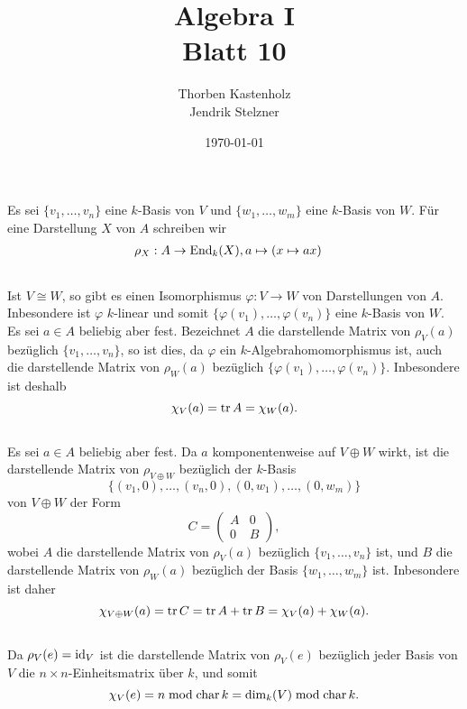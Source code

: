 \documentclass[a4paper,10pt]{article}
\title{\sc Algebra I \\ \Large Blatt 10}
\author{Thorben Kastenholz \\ Jendrik Stelzner}
\date{\today}
\begin{document}
\maketitle






\section{}
Es sei $\{v_1, \ldots, v_n\}$ eine $k$-Basis von $V$ und $\{w_1, \ldots, w_m\}$ eine $k$-Basis von $W$. Für eine Darstellung $X$ von $A$ schreiben wir
\begin{align*}
 &\rho_X : A \to \operatorname{End}_k(X), a \mapsto (x \mapsto ax)
\end{align*}


\subsection{}
Ist $V \cong W$, so gibt es einen Isomorphismus $\varphi : V \to W$ von Darstellungen von $A$. Inbesondere ist $\varphi$ $k$-linear und somit $\{\varphi(v_1), \ldots, \varphi(v_n)\}$ eine $k$-Basis von $W$. Es sei $a \in A$ beliebig aber fest. Bezeichnet $A$ die darstellende Matrix von $\rho_V(a)$ bezüglich $\{v_1, \ldots, v_n\}$, so ist dies, da $\varphi$ ein $k$-Algebrahomomorphismus ist, auch die darstellende Matrix von $\rho_W(a)$ bezüglich $\{\varphi(v_1), \ldots, \varphi(v_n)\}$. Inbesondere ist deshalb
\[
 \chi_V(a) = \operatorname{tr} A = \chi_W(a).
\]


\subsection{}
Es sei $a \in A$ beliebig aber fest. Da $a$ komponentenweise auf $V \oplus W$ wirkt, ist die darstellende Matrix von $\rho_{V \oplus W}$ bezüglich der $k$-Basis
\[
 \{(v_1, 0), \ldots, (v_n, 0), (0, w_1), \ldots, (0, w_m)\}
\]
von $V \oplus W$ der Form
\[
 C =
 \begin{pmatrix}
  A & 0 \\
  0 & B
 \end{pmatrix},
\]
wobei $A$ die darstellende Matrix von $\rho_V(a)$ bezüglich $\{v_1, \ldots, v_n\}$ ist, und $B$ die darstellende Matrix von $\rho_W(a)$ bezüglich der Basis $\{w_1, \ldots, w_m\}$ ist. Inbesondere ist daher
\[
 \chi_{V \oplus W}(a) = \operatorname{tr} C = \operatorname{tr} A + \operatorname{tr} B = \chi_V(a) + \chi_W(a).
\]


\subsection{}
Da $\rho_V(e) = \operatorname{id}_V$ ist die darstellende Matrix von $\rho_V(e)$ bezüglich jeder Basis von $V$ die $n \times n$-Einheitsmatrix über $k$, und somit
\[
 \chi_V(e) = n \bmod \operatorname{char} k = \dim_k(V) \bmod \operatorname{char} k.
\]
\end{document}
